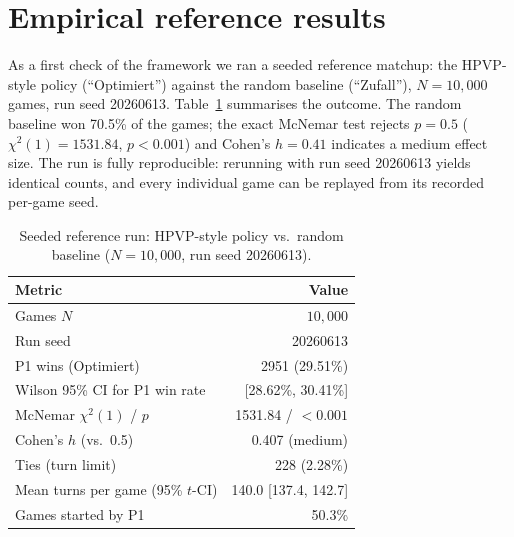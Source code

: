 \documentclass[11pt]{article}
\begin{document}
\section{Empirical reference results}
\label{sec:results}
As a first check of the framework we ran a seeded reference matchup: the HPVP-style policy (``Optimiert'') against the random baseline (``Zufall''), $N=10{,}000$ games, run seed 20260613. Table~\ref{tab:results} summarises the outcome. The random baseline won 70.5\% of the games; the exact McNemar test rejects $p=0.5$ ($\chi^2(1)=1531.84$, $p<0.001$) and Cohen's $h=0.41$ indicates a medium effect size. The run is fully reproducible: rerunning with run seed 20260613 yields identical counts, and every individual game can be replayed from its recorded per-game seed.

\begin{table}[ht]
\centering
{\small
\begin{tabular}{@{}l r@{}}
\toprule
\textbf{Metric} & \textbf{Value} \\
\midrule
Games $N$ & $10{,}000$ \\
Run seed & 20260613 \\
P1 wins (Optimiert) & 2951 (29.51\%) \\
Wilson 95\% CI for P1 win rate & [28.62\%, 30.41\%] \\
McNemar $\chi^2(1)$ / $p$ & 1531.84 / $<0.001$ \\
Cohen's $h$ (vs.\ 0.5) & 0.407 (medium) \\
Ties (turn limit) & 228 (2.28\%) \\
Mean turns per game (95\% $t$-CI) & 140.0 [137.4, 142.7] \\
Games started by P1 & 50.3\% \\
\bottomrule
\end{tabular}
}
\caption{Seeded reference run: HPVP-style policy vs.\ random baseline ($N=10{,}000$, run seed 20260613).}
\label{tab:results}
\end{table}
\end{document}
